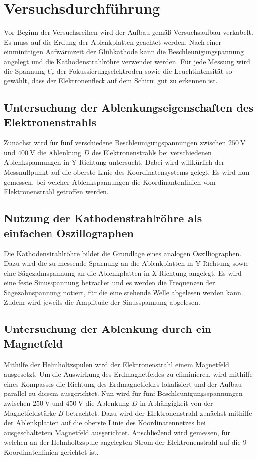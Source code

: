 \section{Versuchsdurchführung}
Vor Beginn der Versuchsreihen wird der Aufbau gemäß Versuchsaufbau verkabelt.
Es muss auf die Erdung der Ablenkplatten geachtet werden.
Nach einer einminütigen Aufwärmzeit der Glühkathode kann die Beschleunigungspannung angelegt und die Kathodenstrahlröhre verwendet werden.
Für jede Messung wird die Spannung $U_c$ der Fokussierungselektroden sowie die Leuchtintensität so gewählt, dass der Elektronenfleck auf dem Schirm gut zu erkennen ist.
\subsection{Untersuchung der Ablenkungseigenschaften des Elektronenstrahls}
Zunächst wird für fünf verschiedene Beschleunigungspannungen zwischen $\SI{250}{\volt}$ und $\SI{400}{\volt}$ die Ablenkung $D$ des Elektronenstrahls bei verschiedenen Ablenkspannungen in Y-Richtung untersucht.
Dabei wird willkürlich der Messnullpunkt auf die oberste Linie des Koordinatensystems gelegt.
Es wird nun gemessen, bei welcher Ablenkspannungen die Koordinantenlinien vom Elektronenstrahl getroffen werden.
\subsection{Nutzung der Kathodenstrahlröhre als einfachen Oszillographen}
Die Kathodenstrahlröhre bildet die Grundlage eines analogen Oszilliographen.
Dazu wird die zu messende Spannung an die Ablenkplatten in Y-Richtung sowie eine Sägezahnspannung an die Ablenkplatten in X-Richtung angelegt.
Es wird eine feste Sinusspannung betrachet und es werden die Frequenzen der Sägezahnspannung notiert, für die eine stehende Welle abgelesen werden kann.
Zudem wird jeweils die Amplitude der Sinusspannung abgelesen.
\label{sec:durchführung}
\subsection{Untersuchung der Ablenkung durch ein Magnetfeld}
Mithilfe der Helmholtzspulen wird der Elektronenstrahl einem Magnetfeld ausgesetzt.
Um die Auswirkung des Erdmagnetfeldes zu eliminieren, wird mithilfe eines Kompasses die Richtung des Erdmagnetfeldes lokalisiert und der Aufbau parallel zu diesem ausgerichtet.
Nun wird für fünf Beschleunigungsspannungen zwischen $\SI{250}{\volt}$ und $\SI{450}{\volt}$ die Ablenkung $D$ in Abhängigkeit von der Magnetfeldstärke $B$ betrachtet.
Dazu wird der Elektronenstrahl zunächst mithilfe der Ablenkplatten auf die oberste Linie des Koordinatennetzes bei ausgeschaltetem Magnetfeld ausgerichtet.
Anschließend wird gemessen, für welchen an der Helmholtzspule angelegten Strom der Elektronenstrahl auf die 9 Koordinatenlinien gerichtet ist.
